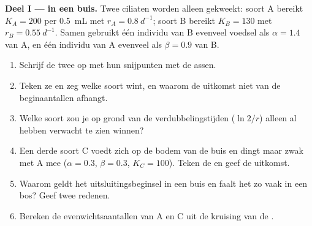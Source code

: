 \begin{problem}
\label{pb:b1:species-interactions:1}

\medskip
\noindent\textbf{Deel I ---  in een buis.}
Twee ciliaten worden alleen gekweekt: soort A bereikt $K_A = 200$ per
\qty{0.5}{mL} met $r_A = \qty{0.8}{d^{-1}}$; soort B bereikt
$K_B = 130$ met $r_B = \qty{0.55}{d^{-1}}$. Samen gebruikt één individu
van B evenveel voedsel als $\alpha = 1.4$ van A, en één individu van A
evenveel als $\beta = 0.9$ van B.
\begin{enumerate}
  \item Schrijf de twee  op met hun snijpunten met de assen.
  \item Teken ze en zeg welke soort wint, en waarom de uitkomst niet van
        de beginaantallen afhangt.
  \item Welke soort zou je op grond van de verdubbelingstijden
        ($\ln 2/r$) alleen al hebben verwacht te zien winnen?
  \item Een derde soort C voedt zich op de bodem van de buis en dingt
        maar zwak met A mee ($\alpha = 0.3$, $\beta = 0.3$, $K_C = 100$).
        Teken de  en geef de uitkomst.
  \item Waarom geldt het uitsluitingsbeginsel in een buis en faalt het zo
        vaak in een bos? Geef twee redenen.
  \item Bereken de evenwichtsaantallen van A en C uit de kruising van de
        .
\end{enumerate}


\end{problem}
